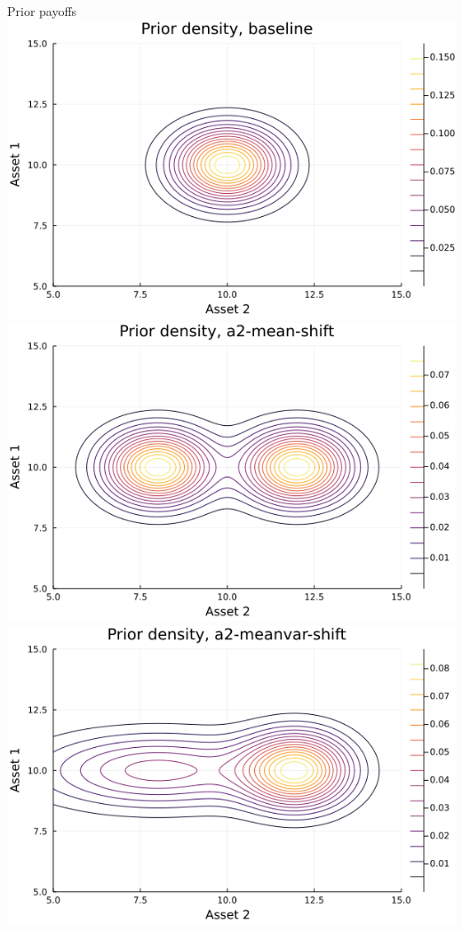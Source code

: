 \documentclass[
  ignorenonframetext,
]{beamer}
\begin{document}
\begin{frame}{Prior payoffs}
\protect\hypertarget{prior-payoffs}{}
\includegraphics[width=0.5\paperheight]{complexity_files/figure-beamer/unnamed-chunk-11-1}
\includegraphics[width=0.5\paperheight]{complexity_files/figure-beamer/unnamed-chunk-11-2}
\includegraphics[width=0.5\paperheight]{complexity_files/figure-beamer/unnamed-chunk-11-3}

\end{frame}
\end{document}
